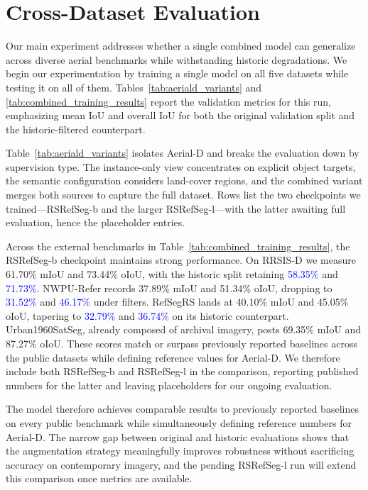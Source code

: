 \section{Cross-Dataset Evaluation}

Our main experiment addresses whether a single combined model can generalize across diverse aerial benchmarks while withstanding historic degradations. We begin our experimentation by training a single model on all five datasets while testing it on all of them. Tables~\ref{tab:aeriald_variants} and \ref{tab:combined_training_results} report the validation metrics for this run, emphasizing mean IoU and overall IoU for both the original validation split and the historic-filtered counterpart.

Table~\ref{tab:aeriald_variants} isolates Aerial-D and breaks the evaluation down by supervision type. The instance-only view concentrates on explicit object targets, the semantic configuration considers land-cover regions, and the combined variant merges both sources to capture the full dataset. Rows list the two checkpoints we trained—RSRefSeg-b and the larger RSRefSeg-l—with the latter awaiting full evaluation, hence the placeholder entries.

Across the external benchmarks in Table~\ref{tab:combined_training_results}, the RSRefSeg-b checkpoint maintains strong performance. On RRSIS-D we measure 61.70\% mIoU and 73.44\% oIoU, with the historic split retaining \textcolor{blue}{58.35\%} and \textcolor{blue}{71.73\%}. NWPU-Refer records 37.89\% mIoU and 51.34\% oIoU, dropping to \textcolor{blue}{31.52\%} and \textcolor{blue}{46.17\%} under filters. RefSegRS lands at 40.10\% mIoU and 45.05\% oIoU, tapering to \textcolor{blue}{32.79\%} and \textcolor{blue}{36.74\%} on its historic counterpart. Urban1960SatSeg, already composed of archival imagery, posts 69.35\% mIoU and 87.27\% oIoU. These scores match or surpass previously reported baselines across the public datasets while defining reference values for Aerial-D. We therefore include both RSRefSeg-b and RSRefSeg-l in the comparison, reporting published numbers for the latter and leaving placeholders for our ongoing evaluation.

The model therefore achieves comparable results to previously reported baselines on every public benchmark while simultaneously defining reference numbers for Aerial-D. The narrow gap between original and historic evaluations shows that the augmentation strategy meaningfully improves robustness without sacrificing accuracy on contemporary imagery, and the pending RSRefSeg-l run will extend this comparison once metrics are available.

